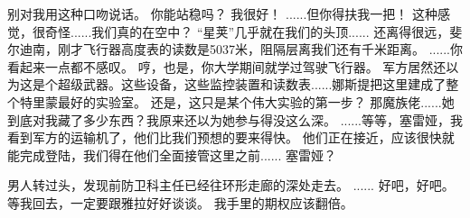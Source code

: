 \documentclass[openany]{book}
\begin{document}
\begin{dialogue}
     别对我用这种口吻说话。
     你能站稳吗？
     我很好！
     ......但你得扶我一把！
     这种感觉，很奇怪......我们真的在空中？
     “星荚”几乎就在我们的头顶......
     还离得很远，斐尔迪南，刚才飞行器高度表的读数是5037米，阻隔层离我们还有千米距离。
     ......你看起来一点都不感叹。
     哼，也是，你大学期间就学过驾驶飞行器。
     军方居然还以为这是个超级武器。这些设备，这些监控装置和读数表......娜斯提把这里建成了整个特里蒙最好的实验室。
     还是，这只是某个伟大实验的第一步？
     那魔族佬......她到底对我藏了多少东西？我原来还以为她参与得没这么深。
     ......等等，塞雷娅，我看到军方的运输机了，他们比我们预想的要来得快。
     他们正在接近，应该很快就能完成登陆，我们得在他们全面接管这里之前......
     塞雷娅？\par
    男人转过头，发现前防卫科主任已经往环形走廊的深处走去。
     ......
     好吧，好吧。
     等我回去，一定要跟雅拉好好谈谈。
     我手里的期权应该翻倍。
\end{dialogue}
\end{document}
